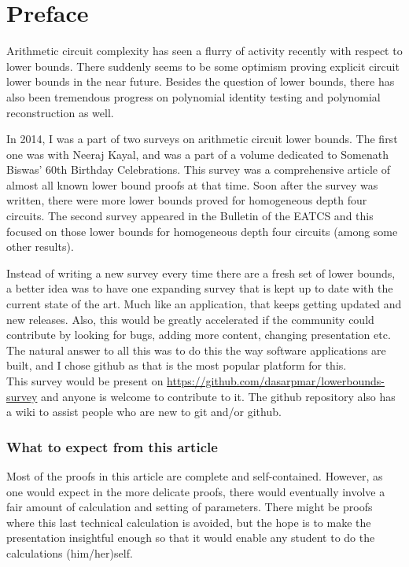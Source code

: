 \chapter*{Preface}

Arithmetic circuit complexity has seen a flurry of activity recently with respect to lower bounds. 
There suddenly seems to be some optimism proving explicit circuit lower bounds in the near future. 
Besides the question of lower bounds, there has also been tremendous progress on polynomial identity testing and polynomial reconstruction as well. 

In 2014, I was a part of two surveys on arithmetic circuit lower bounds. 
The first one \cite{KayalRP} was with Neeraj Kayal, and was a  part of a volume dedicated to Somenath Biswas' 60th Birthday Celebrations. 
This survey was a comprehensive article of almost all known lower bound proofs at that time. 
Soon after the survey was written, there were more lower bounds proved for homogeneous depth four circuits. 
The second survey \cite{rp:beatcs} appeared in the Bulletin of the EATCS and this focused on those lower bounds for homogeneous depth four circuits (among some other results). 

Instead of writing a new survey every time there are a fresh set of lower bounds, a better idea was to have one expanding survey that is kept up to date with the current state of the art. 
Much like an application, that keeps getting updated and new releases. 
Also, this would be greatly accelerated if the community could contribute by looking for bugs, adding more content, changing presentation etc. 
The natural answer to all this was to do this the way software applications are built, and I chose github as that is the most popular platform for this. \\

\noindent 
This survey would be present on \url{https://github.com/dasarpmar/lowerbounds-survey}
and anyone is welcome to contribute to it. 
The github repository also has a wiki to assist people who are new to git and/or github.

\subsection*{What to expect from this article}

Most of the proofs in this article are complete and self-contained. 
However, as one would expect in the more delicate proofs, there would eventually involve a fair amount of calculation and setting of parameters. 
There might be proofs where this last technical calculation is avoided, but the hope is to make the presentation insightful enough so that it would enable any student to do the calculations (him/her)self.

